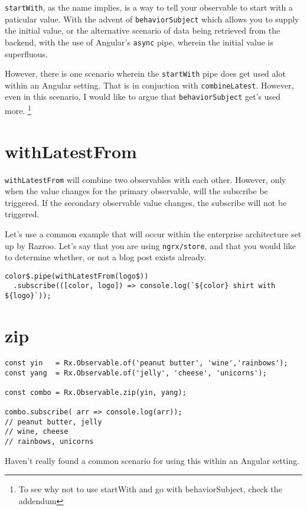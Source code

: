 \lstinline{startWith}, as the name implies, is a way to tell your observable 
to start with a paticular value. With the advent of \lstinline{behaviorSubject}
which allows you to supply the initial value, or the alternative scenario 
of data being retrieved from the backend, with the use of Angular's 
\lstinline{async} pipe, wherein the initial value is superfluous. 

However, there is one scenario wherein the \lstinline{startWith} pipe does get
used alot within an Angular setting. That is in conjuction with 
\lstinline{combineLatest}. However, even in this scenario, I would like to argue
that \lstinline{behaviorSubject} get's used more. \footnote{To see why not to 
use startWith and go with behaviorSubject, check the addendum}

\section{withLatestFrom}
\lstinline{withLatestFrom} will combine two observables with each other. However,
only when the value changes for the primary observable, will the subscribe be 
triggered. If the secondary observable value changes, the subscribe will not be 
triggered. 

Let's use a common example that will occur within the enterprise architecture 
set up by Razroo. Let's say that you are using \lstinline{ngrx/store}, and
that you would like to determine whether, or not a blog post exists already. 

\begin{lstlisting}
color$.pipe(withLatestFrom(logo$))
  .subscribe(([color, logo]) => console.log(`${color} shirt with ${logo}`));
\end{lstlisting}

\section{zip}

\begin{lstlisting}[caption=yin-yang.component.ts]
const yin   = Rx.Observable.of('peanut butter', 'wine','rainbows');
const yang  = Rx.Observable.of('jelly', 'cheese', 'unicorns');

const combo = Rx.Observable.zip(yin, yang);

combo.subscribe( arr => console.log(arr));
// peanut butter, jelly
// wine, cheese
// rainbows, unicorns  
\end{lstlisting}

Haven't really found a common scenario for using this within an Angular 
setting.
